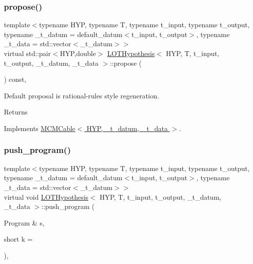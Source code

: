 \mbox{\label{class_l_o_t_hypothesis_ab6cff786f845f0001b497cc606d14c5a}} 
\subsubsection{\texorpdfstring{propose()}{propose()}}
{\footnotesize\ttfamily template$<$typename H\+YP, typename T, typename t\+\_\+input, typename t\+\_\+output, typename \+\_\+t\+\_\+datum = default\+\_\+datum$<$t\+\_\+input, t\+\_\+output$>$, typename \+\_\+t\+\_\+data = std\+::vector$<$\+\_\+t\+\_\+datum$>$$>$ \\
virtual std\+::pair$<$H\+YP,double$>$ \hyperlink{class_l_o_t_hypothesis}{L\+O\+T\+Hypothesis}$<$ H\+YP, T, t\+\_\+input, t\+\_\+output, \+\_\+t\+\_\+datum, \+\_\+t\+\_\+data $>$\+::propose (\begin{DoxyParamCaption}{ }\end{DoxyParamCaption}) const\hspace{0.3cm}{\ttfamily [inline]}, {\ttfamily [virtual]}}

Default proposal is rational-\/rules style regeneration. \begin{DoxyReturn}{Returns}

\end{DoxyReturn}


Implements \hyperlink{class_m_c_m_cable_ab119a14256ab92c5c1e941f8492df830}{M\+C\+M\+Cable$<$ H\+Y\+P, \+\_\+t\+\_\+datum, \+\_\+t\+\_\+data $>$}.

\mbox{\label{class_l_o_t_hypothesis_a0c0048d364936ae2a1bbeeca08959215}} 
\subsubsection{\texorpdfstring{push\+\_\+program()}{push\_program()}}
{\footnotesize\ttfamily template$<$typename H\+YP, typename T, typename t\+\_\+input, typename t\+\_\+output, typename \+\_\+t\+\_\+datum = default\+\_\+datum$<$t\+\_\+input, t\+\_\+output$>$, typename \+\_\+t\+\_\+data = std\+::vector$<$\+\_\+t\+\_\+datum$>$$>$ \\
virtual void \hyperlink{class_l_o_t_hypothesis}{L\+O\+T\+Hypothesis}$<$ H\+YP, T, t\+\_\+input, t\+\_\+output, \+\_\+t\+\_\+datum, \+\_\+t\+\_\+data $>$\+::push\+\_\+program (\begin{DoxyParamCaption}\item[{Program \&}]{s,  }\item[{short}]{k = {} }\end{DoxyParamCaption})\hspace{0.3cm}{\ttfamily [inline]}, {\ttfamily [virtual]}}



